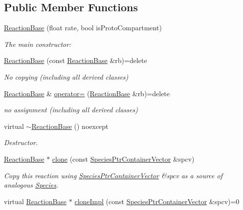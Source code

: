 \subsection*{Public Member Functions}
\begin{DoxyCompactItemize}
\item 
\hyperlink{classReactionBase_af7c12fa6a7f49165a8082ce0d5dc471d}{Reaction\+Base} (float rate, bool is\+Proto\+Compartment)
\begin{DoxyCompactList}\small\item\em The main constructor\+: \end{DoxyCompactList}\item 
\hyperlink{classReactionBase_a3e5551b8e6cac090344edcba4790ac23}{Reaction\+Base} (const \hyperlink{classReactionBase}{Reaction\+Base} \&rb)=delete
\begin{DoxyCompactList}\small\item\em No copying (including all derived classes) \end{DoxyCompactList}\item 
\hyperlink{classReactionBase}{Reaction\+Base} \& \hyperlink{classReactionBase_af79268d6474d9f6bf7b87d1ab1c717a4}{operator=} (\hyperlink{classReactionBase}{Reaction\+Base} \&rb)=delete
\begin{DoxyCompactList}\small\item\em no assignment (including all derived classes) \end{DoxyCompactList}\item 
virtual \hyperlink{classReactionBase_a65e2582da5122a153c729501c1f20f91}{$\sim$\+Reaction\+Base} () noexcept
\begin{DoxyCompactList}\small\item\em Destructor. \end{DoxyCompactList}\item 
\hyperlink{classReactionBase}{Reaction\+Base} $\ast$ \hyperlink{classReactionBase_adb75e6b8d5baf4c5d3f80f3c22a1c919}{clone} (const \hyperlink{classSpeciesPtrContainerVector}{Species\+Ptr\+Container\+Vector} \&spcv)
\begin{DoxyCompactList}\small\item\em Copy this reaction using \hyperlink{classSpeciesPtrContainerVector}{Species\+Ptr\+Container\+Vector} \&spcv as a source of analogous \hyperlink{classSpecies}{Species}. \end{DoxyCompactList}\item 
virtual \hyperlink{classReactionBase}{Reaction\+Base} $\ast$ \hyperlink{classReactionBase_aa29ab15fc3928ebbe73eed14a6684b52}{clone\+Impl} (const \hyperlink{classSpeciesPtrContainerVector}{Species\+Ptr\+Container\+Vector} \&spcv)=0

\end{DoxyCompactItemize}
